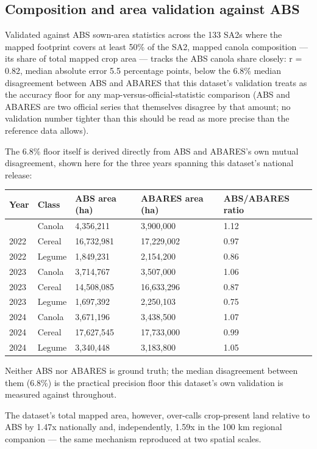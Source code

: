 \subsection*{Composition and area validation against ABS}\label{composition-and-area-validation-against-abs}

Validated against ABS sown-area statistics across the 133 SA2s where the mapped footprint covers at least 50\% of the SA2, mapped canola composition --- its share of total mapped crop area --- tracks the ABS canola share closely: r = 0.82, median absolute error 5.5 percentage points, below the 6.8\% median disagreement between ABS and ABARES that this dataset's validation treats as the accuracy floor for any map-versus-official-statistic comparison (ABS and ABARES are two official series that themselves disagree by that amount; no validation number tighter than this should be read as more precise than the reference data allows).

The 6.8\% floor itself is derived directly from ABS and ABARES's own mutual disagreement, shown here for the three years spanning this dataset's national release:

\begin{longtable}[]{@{}lllll@{}}
\toprule\noalign{}
Year & Class & ABS area (ha) & ABARES area (ha) & ABS/ABARES ratio \\
\midrule\noalign{}
\endhead
\bottomrule\noalign{}
\endlastfoot
2022 & Canola & 4,356,211 & 3,900,000 & 1.12 \\
2022 & Cereal & 16,732,981 & 17,229,002 & 0.97 \\
2022 & Legume & 1,849,231 & 2,154,200 & 0.86 \\
2023 & Canola & 3,714,767 & 3,507,000 & 1.06 \\
2023 & Cereal & 14,508,085 & 16,633,296 & 0.87 \\
2023 & Legume & 1,697,392 & 2,250,103 & 0.75 \\
2024 & Canola & 3,671,196 & 3,438,500 & 1.07 \\
2024 & Cereal & 17,627,545 & 17,733,000 & 0.99 \\
2024 & Legume & 3,340,448 & 3,183,800 & 1.05 \\
\end{longtable}


Neither ABS nor ABARES is ground truth; the median disagreement between them (6.8\%) is the practical precision floor this dataset's own validation is measured against throughout.

The dataset's total mapped area, however, over-calls crop-present land relative to ABS by 1.47x nationally and, independently, 1.59x in the 100 km regional companion --- the same mechanism reproduced at two spatial scales.

